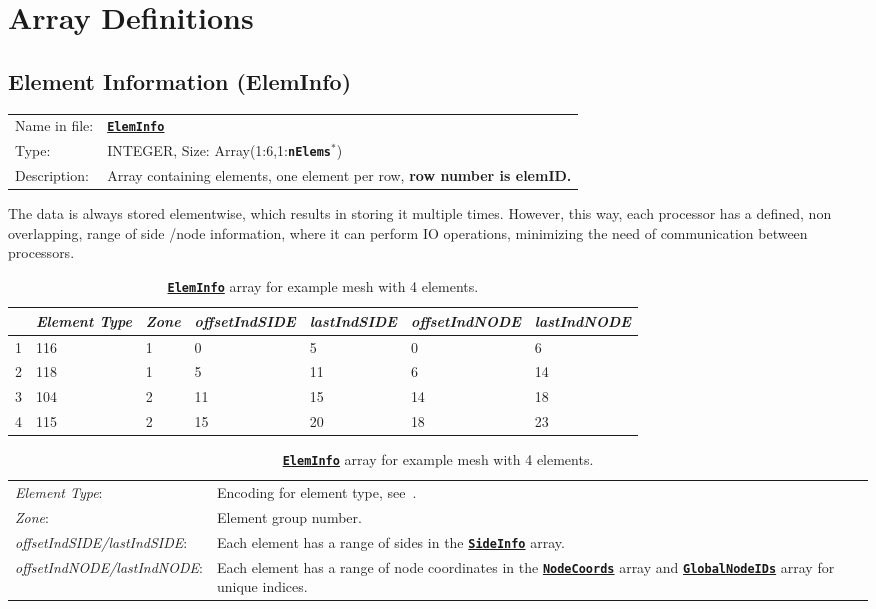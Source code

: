 \documentclass[a4paper,headsepline]{scrreprt}
\newcommand\rf[1]{\prettyref{#1}}
\newcommand\ttbf[1]{\texttt{\textbf{#1}}}
\newcommand\ElemInfo{\hyperlink{ElemInfo}{\ttbf{ElemInfo}}\xspace}
\newcommand\SideInfo{\hyperlink{SideInfo}{\ttbf{SideInfo}}\xspace}
\newcommand\NodeCoords{\hyperlink{NodeInfo}{\ttbf{NodeCoords}}\xspace}
\newcommand\GlobalNodeIDs{\hyperlink{NodeInfo}{\ttbf{GlobalNodeIDs}}\xspace}
\newcommand\nElems{\ttbf{nElems}\xspace}
\begin{document}
\clearpage


\section{Array Definitions}


\hypertarget{ElemInfo}{\subsection{Element Information (ElemInfo)}}
\label{sec:ElemInfo}

\begin{tabularx}{1.0\textwidth}{lX}
Name in file: & \ElemInfo \\
Type:         & INTEGER, Size: Array(1:6,1:\nElems$^*$) \\
Description:  & Array containing elements, one element per row, \textbf{row number is elemID.} \\
\end{tabularx}

The data is always stored elementwise, which results in storing it multiple times. However, this way, each processor has a defined, non overlapping, range of side /node information, where it can perform IO operations, minimizing the need of communication between processors. 

\begin{table}[h!]
\centering
\begin{tabular}{|l|l|l|l|l|l|l|} \hline
  & \emph{Element Type} & \emph{Zone} & \emph{offsetIndSIDE} & \emph{lastIndSIDE} & \emph{offsetIndNODE} & \emph{lastIndNODE} \\ \hline\hline
1 & 116 & 1 &  0 &  5 &  0 &  6 \\ \hline
2 & 118 & 1 &  5 & 11 &  6 & 14 \\ \hline
3 & 104 & 2 & 11 & 15 & 14 & 18 \\ \hline
4 & 115 & 2 & 15 & 20 & 18 & 23 \\ \hline
\end{tabular} \vspace{2ex}

\begin{tabularx}{1.0\textwidth}{|lX|} \hline
\emph{Element Type}: & Encoding for element type, see~\rf{sec:elemtypes}. \\
%
\emph{Zone}: & Element group number. \\
%
\emph{offsetIndSIDE/lastIndSIDE}: & Each element has a range of sides in the \SideInfo array. \\
%
\emph{offsetIndNODE/lastIndNODE}: & Each element has a range of node coordinates in the \NodeCoords array and \GlobalNodeIDs array for unique indices. \\\hline
\end{tabularx}
\caption{\protect\ElemInfo array for example mesh \rf{fig:exmesh} with 4 elements.}
\label{tab:ex_eleminfo}
\end{table}
\end{document}
